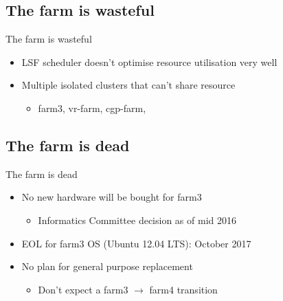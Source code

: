 \documentclass[xcolor=x11names,compress]{beamer}
\makeatletter
\renewcommand{\(}{\begin{columns}}
\renewcommand{\)}{\end{columns}}
\newcommand{\<}[1]{\begin{column}{#1}}
\renewcommand{\>}{\end{column}}
\newenvironment{backgroundblock}[2]{%
  \global\setbox\@backgroundblock=\vbox\bgroup%
    \unvbox\@backgroundblock%
    \vbox to0pt\bgroup\vskip#2\hbox to0pt\bgroup\hskip#1\relax%
}{\egroup\egroup\egroup}
\makeatother
\begin{document}
\subsection*{The farm is wasteful}
\begin{frame}{The farm is wasteful}
\dcbackground
\begin{shadedbox}
\begin{itemize}
\item LSF scheduler doesn't optimise resource utilisation very well
\item Multiple isolated clusters that can't share resource
	\begin{itemize}
	\item farm3, vr-farm, cgp-farm, 
	\end{itemize}
\end{itemize}
\end{shadedbox}
\end{frame}

\subsection*{The farm is dead}
\begin{frame}{The farm is dead}
\dcbackground
\begin{shadedbox}
\begin{itemize}
\item No new hardware will be bought for farm3
	\begin{itemize}
	\item Informatics Committee decision as of mid 2016
	\end{itemize}
\item EOL for farm3 OS (Ubuntu 12.04 LTS): October 2017
\item No plan for general purpose replacement %
	\begin{itemize}
	\item Don't expect a farm3 $\rightarrow$ farm4 transition %
	\end{itemize}
\end{itemize}
\end{shadedbox}
\end{frame}


\end{document}
